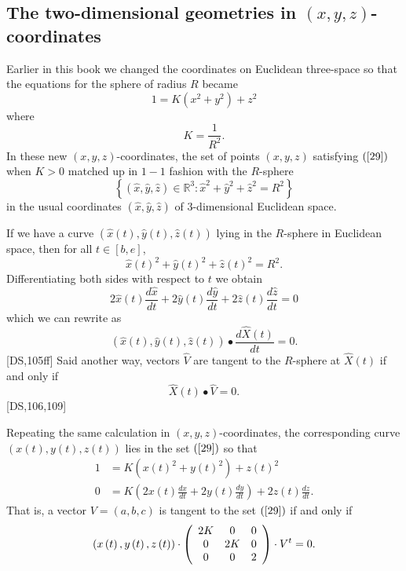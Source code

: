 

\subsection*{The two-dimensional geometries in $\left(x,y,z\right)
$-coordinates}


Earlier in this book we changed the coordinates on Euclidean
three-space so that the equations for the sphere of radius $R$ became%
\begin{equation}
1=K\left(  x^{2}+y^{2}\right)  +z^{2} \label{29}%
\end{equation}
where%
\[
K=\frac{1}{R^{2}}.
\]
In these new $\left(  x,y,z\right)  $-coordinates, the set of points $\left(
x,y,z\right)  $ satisfying $\left(  \ref{29}\right)  $ when $K>0$ matched up
in $1-1$ fashion with the $R$-sphere%
\[
\left\{  \left(  \hat{x},\hat{y},\hat{z}\right)  \in\mathbb{R}^{3}:\hat{x}%
^{2}+\hat{y}^{2}+\hat{z}^{2}=R^{2}\right\}
\]
in the usual coordinates $\left(  \hat{x},\hat{y},\hat{z}\right)  $ of
$3$-dimensional Euclidean space.

If we have a curve $\left(  \hat{x}\left(  t\right)  ,\hat{y}\left(  t\right)
,\hat{z}\left(  t\right)  \right)  $ lying in the $R$-sphere in Euclidean
space, then for all $t\in\left[  b,e\right]  $,%
\[
\hat{x}\left(  t\right)  ^{2}+\hat{y}\left(  t\right)  ^{2}+\hat{z}\left(
t\right)  ^{2}=R^{2}.
\]
Differentiating both sides with respect to $t$ we obtain%
\[
2\hat{x}\left(  t\right)  \frac{d\hat{x}}{dt}+2\hat{y}\left(  t\right)
\frac{d\hat{y}}{dt}+2\hat{z}\left(  t\right)  \frac{d\hat{z}}{dt}=0
\]
which we can rewrite as%
\[
\left(  \hat{x}\left(  t\right)  ,\hat{y}\left(  t\right)  ,\hat{z}\left(
t\right)  \right)  \bullet\frac{d\hat{X}\left(  t\right)  }{dt}=0.
\]
[DS,105ff] Said another way, vectors $\hat{V}$ are tangent to the $R$-sphere
at $\hat{X}\left(  t\right)  $ if and only if%
\[
\hat{X}\left(  t\right)  \bullet\hat{V}=0.
\]
[DS,106,109]

Repeating the same calculation in $\left(  x,y,z\right)  $-coordinates, the
corresponding curve $\left(  x\left(  t\right)  ,y\left(  t\right)  ,z\left(
t\right)  \right)  $ lies in the set $\left(  \ref{29}\right)  $ so that%
\begin{align*}
1  &  =K\left(  x\left(  t\right)  ^{2}+y\left(  t\right)  ^{2}\right)
+z\left(  t\right)  ^{2}\\
0  &  =K\left(  2x\left(  t\right)  \frac{dx}{dt}+2y\left(  t\right)
\frac{dy}{dt}\right)  +2z\left(  t\right)  \frac{dz}{dt}.
\end{align*}
That is, a vector $V=\left(  a,b,c\right)  $ is tangent to the set $\left(
\ref{29}\right)  $ if and only if%
\begin{equation}
\left(  x\left(  t\right)  ,y\left(  t\right)  ,z\left(  t\right)  \right)
\cdot\left(
\begin{array}
[c]{ccc}%
2K & 0 & 0\\
0 & 2K & 0\\
0 & 0 & 2
\end{array}
\right)  \cdot V^{t}=0. \label{56}%
\end{equation}


